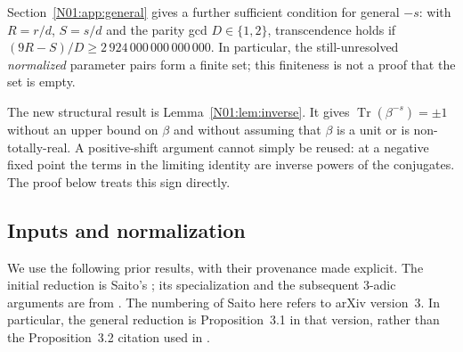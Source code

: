 \documentclass[11pt,a4paper]{article}
\theoremstyle{definition}\newtheorem{definition}[theorem]{Definition}
\theoremstyle{remark}\newtheorem{remark}[theorem]{Remark}
\DeclareMathOperator{\Tr}{Tr}\DeclareMathOperator{\tr}{tr}\DeclareMathOperator{\Nm}{N}
\begin{document}
Section~\ref{N01:app:general} gives a further sufficient condition for
general $-s$: with $R=r/d$, $S=s/d$ and the parity gcd $D\in\{1,2\}$,
transcendence holds if $(9R-S)/D\ge2\,924\,000\,000\,000\,000$.
In particular, the still-unresolved \emph{normalized} parameter pairs
form a finite set; this finiteness is not a proof that the set is empty.

The new structural result is Lemma~\ref{N01:lem:inverse}. It gives
$\Tr(\beta^{-s})=\pm1$ without an upper bound on $\beta$ and without
assuming that $\beta$ is a unit or is non-totally-real. A positive-shift
argument cannot simply be reused: at a negative fixed point the terms in
the limiting identity are inverse powers of the conjugates. The proof
below treats this sign directly.

\subsection{Inputs and normalization}\label{N01:sec:inputs}

We use the following prior results, with their provenance made explicit.
The initial reduction is Saito's \cite[Proposition~3.1]{Saito}; its
specialization and the subsequent $3$-adic arguments are from \cite{K064}.
The numbering of Saito here refers to arXiv version~3. In particular, the
general reduction is Proposition~3.1 in that version, rather than the
Proposition~3.2 citation used in \cite{K064}.
\end{document}
